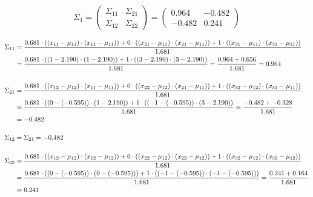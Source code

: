 \documentclass[12pt]{article}
\begin{document}
\begin{enumerate}
\begin{enumerate}[label=\arabic*)]
\begin{itemize}[label=]
        \begin{equation*}
            \Sigma_1 = \begin{pmatrix}
                \Sigma_{11} & \Sigma_{21} \\
                \Sigma_{12} & \Sigma_{22}
            \end{pmatrix} = \begin{pmatrix}
                0.964 & -0.482 \\
                -0.482 & 0.241
            \end{pmatrix}
        \end{equation*}

        \begin{equation*}
            \fontsize{9.5pt}{10pt}\selectfont
            \begin{aligned}
                \Sigma_{11} &= \frac{0.681 \cdot \left((x_{11}-\mu_{11}) \cdot (x_{11} - \mu_{11})\right)+ 0 \cdot \left((x_{21}-\mu_{11}) \cdot (x_{21} - \mu_{11})\right)+ 1 \cdot \left((x_{31}-\mu_{11}) \cdot (x_{31} - \mu_{11})\right)}{1.681}\\
                &=\frac{0.681 \cdot \left((1-2.190) \cdot (1 - 2.190)\right) + 1 \cdot \left((3-2.190) \cdot (3 - 2.190)\right)}{1.681} = \frac{0.964 + 0.656}{1.681} = 0.964\\
                \\
                \Sigma_{21} &= \frac{0.681 \cdot \left((x_{12}-\mu_{12}) \cdot (x_{11} - \mu_{11})\right)+ 0 \cdot \left((x_{22}-\mu_{12}) \cdot (x_{21} - \mu_{11})\right)+ 1 \cdot \left((x_{32}-\mu_{12}) \cdot (x_{31} - \mu_{11})\right)}{1.681}\\
                &=\frac{0.681 \cdot \left((0-(-0.595)) \cdot (1 - 2.190)\right) + 1 \cdot \left((-1-(-0.595)) \cdot (3 - 2.190)\right)}{1.681} = \frac{-0.482 + -0.328}{1.681} \\
                &= -0.482\\
                \\
                \Sigma_{12} &= \Sigma_{21} = -0.482\\
                \\
                \Sigma_{22} &= \frac{0.681 \cdot \left((x_{12}-\mu_{12}) \cdot (x_{12} - \mu_{12})\right)+ 0 \cdot \left((x_{22}-\mu_{12}) \cdot (x_{22} - \mu_{12})\right)+ 1 \cdot \left((x_{32}-\mu_{12}) \cdot (x_{32} - \mu_{12})\right)}{1.681}\\
                &=\frac{0.681 \cdot \left((0-(-0.595)) \cdot (0-(-0.595))\right) + 1 \cdot \left((-1-(-0.595)) \cdot (-1-(-0.595))\right)}{1.681} = \frac{0.241 + 0.164}{1.681}\\
                &= 0.241\\
            \end{aligned}
        \end{equation*}


\end{itemize}
\end{enumerate}
\end{enumerate}
\end{document}
